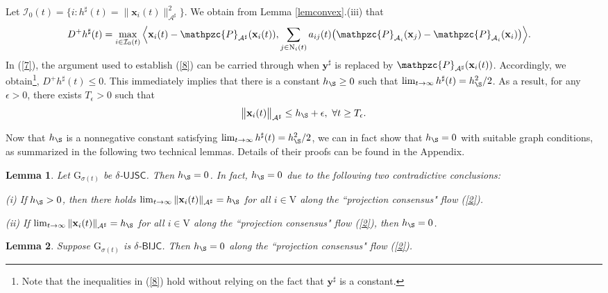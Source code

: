 \documentclass[a4paper, 11pt]{article}
\newtheorem{lemma}{Lemma}
\begin{document}
Let $\mathcal{I}_0(t)=\big\{i: h^\sharp(t)= \big\|\mathbf{x}_i(t)\big\|_{\mathcal{A}^\sharp}^2\big\}$.  We obtain from Lemma \ref{lemconvex}.(iii) that
\begin{align}\label{7}
D^+h^\sharp(t)&=\max_{i\in\mathcal{I}_0(t)} \Big\langle \mathbf{x}_i(t)-\mathpzc{P}_{\mathcal{A}^\sharp}(\mathbf{x}_i(t)), \sum_{j\in \mathrm{N}_i(t)}a_{ij}(t)\big(\mathpzc{P}_{\mathcal{A}_i}(\mathbf{x}_j)-\mathpzc{P}_{\mathcal{A}_i}(\mathbf{x}_i)\big)\Big\rangle.
\end{align}
In (\ref{7}), the argument used to establish (\ref{8}) can be carried through when $\mathbf{y}^\sharp$  is replaced by  $\mathpzc{P}_{\mathcal{A}^\sharp}(\mathbf{x}_i(t))$. Accordingly, we obtain\footnote{Note that the inequalities in (\ref{8}) hold without relying   on the fact that $\mathbf{y}^\sharp$ is a constant.}, $D^+h^\sharp(t)\leq 0$. This immediately implies that   there is a  constant $h_\S\geq 0$ such that $
\lim_{t\to \infty}h^\sharp(t)=h_\S^2/2$. As a result, for any $\epsilon>0$, there exists $T_{\epsilon}>0$ such that
\begin{align}\label{10}
\big\|\mathbf{x}_i(t)\big\|_{\mathcal{A}^\sharp}\leq h_\S+\epsilon,\ \forall t\geq  T_{\epsilon}.
\end{align}


Now that $h_\S$ is a nonnegative constant satisfying  $
\lim_{t\to \infty}h^\sharp(t)=h_\S^2/2$, we can in fact show that $h_\S=0$ with suitable graph conditions, as summarized in the following  two technical lemmas. Details of their proofs can be found  in the Appendix.


\medskip




\begin{lemma}\label{lem:directed}
Let  $\mathrm{G}_{\sigma(t)}$ be $\delta$-$\mathsf{UJSC}$. Then $h_\S=0$. In fact, $h_\S=0$ due to the following two contradictive conclusions:

  (i) If $h_\S>0$, then  there holds   $\lim_{t\to\infty}\|\mathbf{x}_i(t)\|_{\mathcal{A}^\sharp}=h_\S$ for all $i\in \mathrm{V}$  along the ``projection consensus" flow (\ref{2}).

  (ii) If    $\lim_{t\to\infty}\|\mathbf{x}_i(t)\|_{\mathcal{A}^\sharp}=h_\S$  for all $i\in \mathrm{V}$  along the ``projection consensus" flow (\ref{2}), then $h_\S=0$.
\end{lemma}




\medskip

\begin{lemma}\label{lemma-bidirectional}
Suppose $\mathrm{G}_{\sigma(t)}$ is $\delta$-$\mathsf{BIJC}$. Then $h_\S=0$ along the ``projection consensus" flow (\ref{2}).
\end{lemma}
\end{document}

